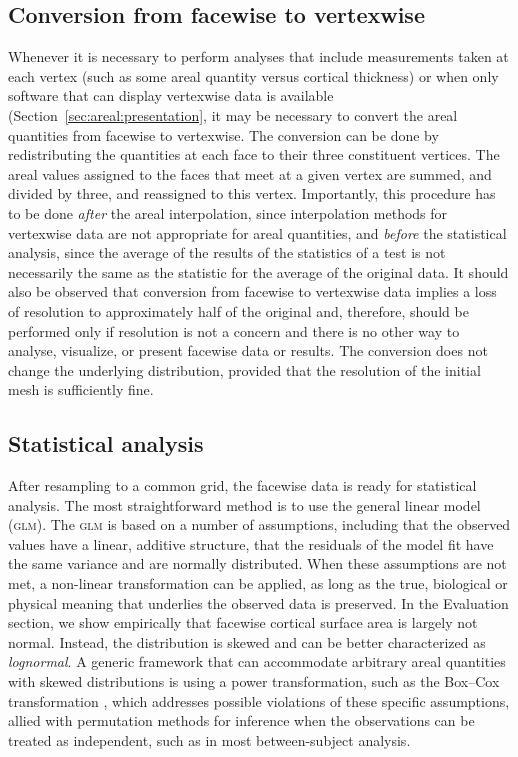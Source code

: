\subsection{Conversion from facewise to vertexwise}
\label{sec:areal:conversion}

Whenever it is necessary to perform analyses that include measurements taken at each vertex (such as some areal quantity versus cortical thickness) or when only software that can display vertexwise data is available (Section~\ref{sec:areal:presentation}, it may be necessary to convert the areal quantities from facewise to vertexwise. The conversion can be done by redistributing the quantities at each face to their three constituent vertices. The areal values assigned to the faces that meet at a given vertex are summed, and divided by three, and reassigned to this vertex. Importantly, this procedure has to be done \emph{after} the areal interpolation, since interpolation methods for vertexwise data are not appropriate for areal quantities, and \emph{before} the statistical analysis, since the average of the results of the statistics of a test is not necessarily the same as the statistic for the average of the original data. It should also be observed that conversion from facewise to vertexwise data implies a loss of resolution to approximately half of the original and, therefore, should be performed only if resolution is not a concern and there is no other way to analyse, visualize, or present facewise data or results. The conversion does not change the underlying distribution, provided that the resolution of the initial mesh is sufficiently fine.

\subsection{Statistical analysis}

After resampling to a common grid, the facewise data is ready for statistical analysis. The most straightforward method is to use the general linear model (\textsc{glm}). The \textsc{glm} is based on a number of assumptions, including that the observed values have a linear, additive structure, that the residuals of the model fit have the same variance and are normally distributed. When these assumptions are not met, a non-linear transformation can be applied, as long as the true, biological or physical meaning that underlies the observed data is preserved. In the Evaluation section, we show empirically that facewise cortical surface area is largely not normal. Instead, the distribution is skewed and can be better characterized as \emph{lognormal}. A generic framework that can accommodate arbitrary areal quantities with skewed distributions is using a power transformation, such as the Box--Cox transformation \citep{Box1964}, which addresses possible violations of these specific assumptions, allied with permutation methods for inference \citep[see also Chapter~\ref{sec:perm}]{Holmes1996, Nichols2003} when the observations can be treated as independent, such as in most between-subject analysis.

